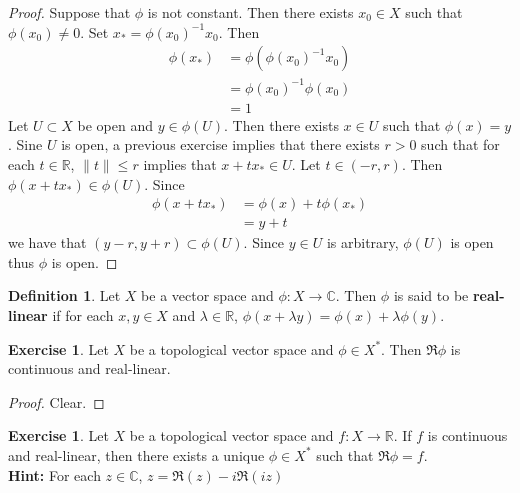 \documentclass[12pt]{amsart}
\theoremstyle{definition}
\newtheorem{defn}[definition]{Definition}
\newtheorem{ex}[definition]{Exercise}
\newcommand{\lam}{\lambda}
\newcommand{\C}{\mathbb{C}}
\newcommand{\R}{\mathbb{R}}
\begin{document}
	\begin{proof}
		Suppose that $\phi$ is not constant. Then there exists $x_0 \in X$ such that $\phi(x_0) \neq 0$. Set $x_* = \phi(x_0)^{-1} x_0$. Then
		\begin{align*}
			\phi(x_*)
			&= \phi(\phi(x_0)^{-1}x_0) \\
			&= \phi(x_0)^{-1}\phi(x_0) \\
			&= 1
		\end{align*}
		Let $U \subset X$ be open and $y \in \phi(U)$. Then there exists $x \in U$ such that $\phi(x) = y$. Sine $U$ is open, a previous exercise implies that there exists $r > 0$ such that for each $t \in \R$, $\|t\| \leq r$ implies that $x + tx_* \in U$. Let $t \in (-r, r)$. Then $\phi(x+ tx_*) \in \phi(U)$. Since 
		\begin{align*}
			\phi(x+ tx_*) 
			&= \phi(x) + t\phi(x_*) \\
			&= y + t
		\end{align*}
	we have that $(y-r, y+r) \subset \phi(U)$. Since $y \in U$ is arbitrary, $\phi(U)$ is open thus $\phi$ is open. 
	\end{proof}

	\begin{defn}
		Let $X$ be a vector space and $\phi: X \rightarrow \C$. Then $\phi$ is said to be \textbf{real-linear} if for each $x,y \in X$ and $\lam \in \R$, $\phi(x+ \lam y) = \phi(x) + \lam \phi(y)$.
	\end{defn}

	\begin{ex}
		Let $X$ be a topological vector space and $\phi \in X^*$. Then $\Re \phi$ is continuous and real-linear. 
	\end{ex}

	\begin{proof}
		Clear.
	\end{proof}

	\begin{ex}
		Let $X$ be a topological vector space and $f:X \rightarrow \R$. If $f$ is continuous and real-linear, then there exists a unique $\phi \in X^*$ such that $\Re \phi = f$. \\
		\textbf{Hint:} For each $z \in \C$, $z = \Re(z) - i \Re(iz)$
	\end{ex}
	
\end{document}
